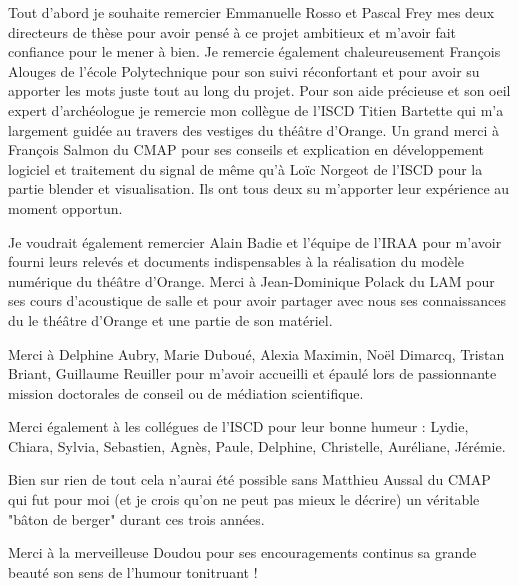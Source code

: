 Tout d'abord je souhaite remercier Emmanuelle Rosso et Pascal Frey mes deux directeurs de thèse pour avoir pensé à ce projet ambitieux et m'avoir fait confiance pour le mener à bien. Je remercie également chaleureusement François Alouges de l'école Polytechnique pour son suivi réconfortant et pour avoir su apporter les mots juste tout au long du projet. Pour son aide précieuse et son oeil expert d'archéologue je remercie mon collègue de l'ISCD Titien Bartette qui m'a largement guidée au travers des vestiges du théâtre d'Orange. Un grand merci à François Salmon du CMAP pour ses conseils et explication en développement logiciel et traitement du signal de même qu'à Loïc Norgeot de l'ISCD pour la partie blender et visualisation. Ils ont tous deux su m'apporter leur expérience au moment opportun. 

Je voudrait également remercier Alain Badie et l'équipe de l'IRAA pour m'avoir fourni leurs relevés et documents indispensables à la réalisation du modèle numérique du théâtre d'Orange. Merci à Jean-Dominique Polack du LAM pour ses cours d'acoustique de salle et pour avoir partager avec nous ses connaissances du le théâtre d'Orange et une partie de son matériel.

Merci à Delphine Aubry, Marie Duboué, Alexia Maximin, Noël Dimarcq, Tristan Briant, Guillaume Reuiller pour m'avoir accueilli et épaulé lors de passionnante mission doctorales de conseil ou de médiation scientifique.

Merci également à les collégues de l'ISCD pour leur bonne humeur : Lydie, Chiara, Sylvia, Sebastien, Agnès, Paule, Delphine, Christelle, Auréliane, Jérémie.

Bien sur rien de tout cela n'aurai été possible sans Matthieu Aussal du CMAP qui fut pour moi (et je crois qu'on ne peut pas mieux le décrire) un véritable "bâton de berger" durant ces trois années.

Merci à la merveilleuse Doudou pour ses encouragements continus sa grande beauté son sens de l'humour tonitruant !